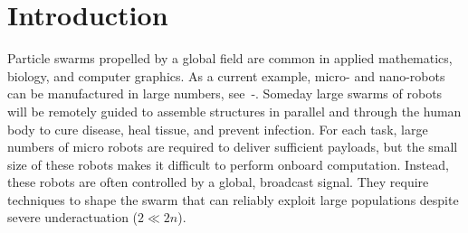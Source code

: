 \section{Introduction}\label{sec:Intro}
Particle swarms propelled by a global field are common in applied mathematics, biology, and computer graphics. 
As a current example, micro- and nano-robots can be manufactured in large numbers, see~\citep{Chowdhury2015}-\citep{qiu2015magnetic}.
Someday large swarms of robots will be remotely guided
to assemble structures in parallel and 
 through the human body to cure disease, heal tissue, and prevent infection. %
 For each task, large numbers of micro robots are required to deliver sufficient payloads, but the small size of these robots makes it difficult to perform onboard computation.  Instead, these robots are often controlled by a global, broadcast signal. 
They require techniques to shape the swarm that can reliably exploit large populations despite severe underactuation ($2 \ll2n$).  
 


